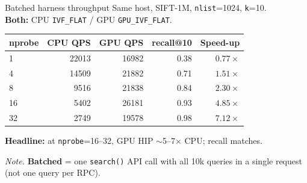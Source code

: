 \documentclass[aspectratio=169,11pt]{beamer}
\begin{document}
\begin{frame}{Batched harness throughput}
  \footnotesize
  Same host, SIFT-1M, \texttt{nlist}=1024, \texttt{k}=10.\\
  \textbf{Both:} CPU \texttt{IVF\_FLAT} / GPU \texttt{GPU\_IVF\_FLAT}.\\[0.25em]

  \begin{center}
  \begin{tabular}{@{}lrrrr@{}}
    \toprule
    \textbf{nprobe} & \textbf{CPU QPS} & \textbf{GPU QPS} & \textbf{recall@10} & \textbf{Speed-up} \\
    \midrule
    1  & 22013 & 16982 & 0.38 & $0.77\times$ \\
    4  & 14509 & 21882 & 0.71 & $1.51\times$ \\
    8  &  9516 & 21838 & 0.84 & $2.30\times$ \\
    16 &  5402 & 26181 & 0.93 & $4.85\times$ \\
    32 &  2749 & 19578 & 0.98 & $7.12\times$ \\
    \bottomrule
  \end{tabular}
  \end{center}

  \vspace{0.3em}
  \textbf{Headline:} at \texttt{nprobe}=16--32, GPU HIP $\sim$5--7$\times$ CPU; recall matches.

  \vfill
  {\scriptsize\textit{Note.}
  \textbf{Batched} = one \texttt{search()} API call with all 10k queries in a single request
  (not one query per RPC).}
\end{frame}
\end{document}
